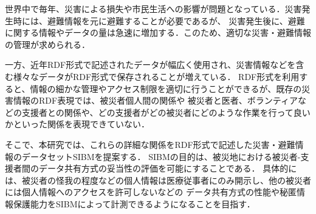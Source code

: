 ﻿
世界中で毎年、災害による損失や市民生活への影響が問題となっている．災害発生時には、避難情報を元に避難することが必要であるが、
災害発生後に、避難に関する情報やデータの量は急速に増加する．このため、適切な災害・避難情報の管理が求められる．

一方、近年RDF形式で記述されたデータが幅広く使用され、災害情報などを含む様々なデータがRDF形式で保存されることが増えている．
RDF形式を利用すると、情報の細かな管理やアクセス制限を適切に行うことができるが、既存の災害情報のRDF表現では、被災者個人間の関係や
被災者と医者、ボランティアなどの支援者との関係や、どの支援者がどの被災者にどのような作業を行って良いかといった関係を表現できていない．

そこで、本研究では、これらの詳細な関係をRDF形式で記述した災害・避難情報のデータセットSIBMを提案する．
SIBMの目的は、被災地における被災者-支援者間のデータ共有方式の妥当性の評価を可能にすることである．
具体的には、被災者の怪我の程度などの個人情報は医療従事者にのみ開示し、他の被災者には個人情報へのアクセスを許可しないなどの
データ共有方式の性能や秘匿情報保護能力をSIBMによって計測できるようになることを目指す．
